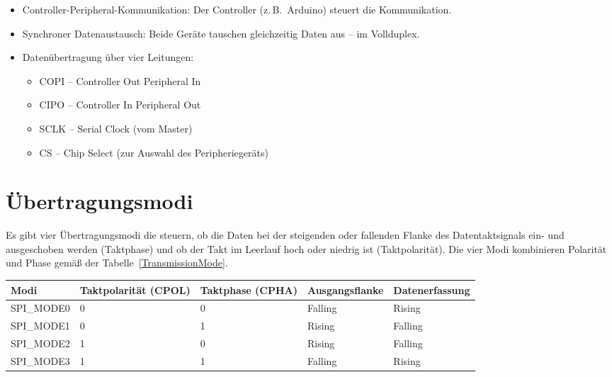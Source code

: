 \begin{itemize}
	\item Controller-Peripheral-Kommunikation: Der Controller (z.\,B.\ Arduino) steuert die Kommunikation. 
	\item Synchroner Datenaustausch: Beide Geräte tauschen gleichzeitig Daten aus – im Vollduplex.
	\item Datenübertragung über vier Leitungen:
	\begin{itemize}
		\item COPI – Controller Out Peripheral In
		\item CIPO – Controller In Peripheral Out
		\item SCLK – Serial Clock (vom Master)
		\item CS – Chip Select (zur Auswahl des Peripheriegeräts)
	\end{itemize}
\end{itemize}

\section{Übertragungsmodi}

Es gibt vier Übertragungsmodi die steuern, ob die Daten bei der steigenden oder fallenden Flanke des Datentaktsignals ein- und ausgeschoben werden (Taktphase) und ob der Takt im Leerlauf hoch oder niedrig ist (Taktpolarität). Die vier Modi kombinieren Polarität und Phase gemäß der Tabelle~\ref{TransmissionMode}.

\begin{center}
	\begin{tabular}{|l|l|l|l|l|}
		\hline
		Modi & Taktpolarität (CPOL) & Taktphase (CPHA) & Ausgangsflanke & Datenerfassung
		\\ \hline
		SPI\_MODE0 & 0   & 0 & Falling & Rising  \\
		\hline
		SPI\_MODE1 & 0   & 1 & Rising  & Falling \\
		\hline
		SPI\_MODE2 & 1   & 0 & Rising  & Falling \\
		\hline
		SPI\_MODE3 & 1   & 1 & Falling & Rising  \\
		\hline
	\end{tabular}
	\label{TransmissionMode} 
\end{center}


